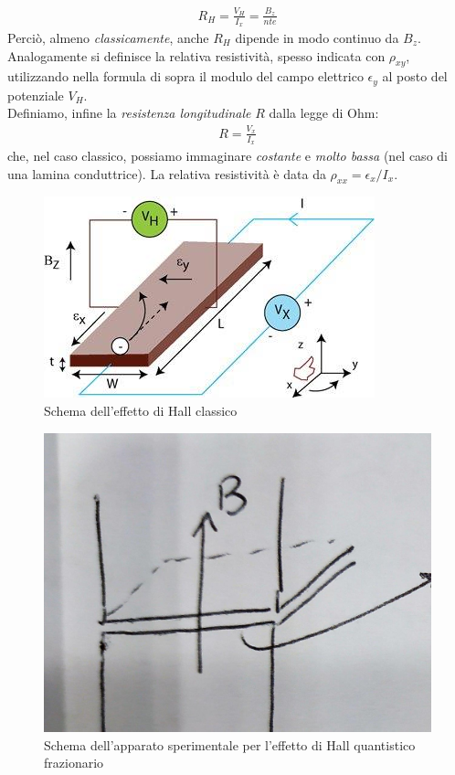 \documentclass[../../FisicaTeorica.tex]{subfiles}
\begin{document}
\begin{expl}
\begin{align*}
R_H = \frac{V_H}{I_x} = \frac{B_z}{nte}
\end{align*}
Perciò, almeno \textit{classicamente}, anche $R_H$ dipende in modo continuo da $B_z$. Analogamente si definisce la relativa resistività, spesso indicata con $\rho_{xy}$, utilizzando nella formula di sopra il modulo del campo elettrico $\epsilon_y$ al posto del potenziale $V_H$. \\
Definiamo, infine la \textit{resistenza longitudinale} $R$ dalla legge di Ohm:
\begin{align*}
R = \frac{V_x}{I_x}
\end{align*} 
che, nel caso classico, possiamo immaginare \textit{costante} e \textit{molto bassa} (nel caso di una lamina conduttrice). La relativa resistività è data da $\rho_{xx}=\epsilon_x/I_x$.
\begin{figure}[H]
\centering
\includegraphics[scale=0.5]{Immagini/12_12/image011.jpg}
\caption{Schema dell'effetto di Hall classico\label{fig:hall_classico}}
\end{figure}
\end{expl}
\begin{figure}[H]
\centering
\includegraphics[scale=0.2]{Immagini/12_12/image009.jpg}
\caption{Schema dell'apparato sperimentale per l'effetto di Hall quantistico frazionario}
\end{figure}
\end{document}
